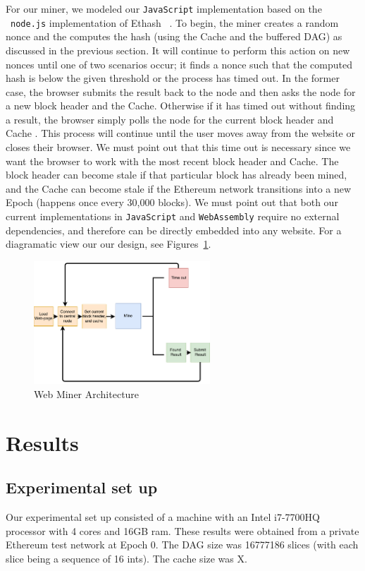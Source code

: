\documentclass[runningheads]{llncs}
\begin{document}
For our miner, we modeled our \verb|JavaScript| implementation based on the ~\verb|node.js| implementation of Ethash ~\cite{ethash}. To begin, the miner creates a random nonce and the computes the hash (using the Cache and the buffered DAG) as discussed in the previous section. It will continue to perform this action on new nonces until one of two scenarios occur; it finds a nonce such that the computed hash is below the given threshold or the process has timed out. In the former case, the browser submits the result back to the node and then asks the node for a new block header and the Cache. Otherwise if it has timed out without finding a result, the browser simply polls the node for the current block header and Cache . This process will continue until the user moves away from the website or closes their browser. 
We must point out that this time out is necessary since we want the browser to work with the most recent block header and Cache. The block header can become stale if that particular block has already been mined, and the Cache can become stale if the Ethereum network transitions into a new Epoch (happens once every 30,000 blocks). 
We must point out that both our current implementations in \verb|JavaScript| and \verb|WebAssembly| require no external dependencies, and therefore can be directly embedded into any website. For a diagramatic view our our design, see Figures~\ref{fig:hybridArchitecture}.

\begin{figure}[H]
\centering
\includegraphics[width=250px,keepaspectratio]{Hybrid-Miner.pdf}
\caption{\label{fig:hybridArchitecture} Web Miner Architecture}
\end{figure}

\section{Results}
\subsection{Experimental set up}
Our experimental set up consisted of a machine with an Intel i7-7700HQ processor with 4 cores and 16GB ram. These results were obtained from a private Ethereum test network at Epoch 0. The DAG size was 16777186 slices (with each slice being a sequence of 16 ints). The cache size was X.
\end{document}
